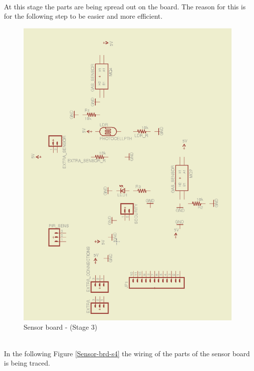 \documentclass[12pt,a4paper,draft]{report}
\begin{document}
\ \\
At this stage the parts are being spread out on the board.
The reason for this is for the following step to be easier and more efficient.
\ \\
\begin{figure}[H]
\centering
\includegraphics*[scale=0.25]{sens_brd_s3}
\caption{Sensor board -  (Stage 3)}
\label{Sensor-brd-s3}
\end{figure}
\ \\
In the following Figure \ref{Sensor-brd-s4} the wiring of the parts of the sensor board is being traced.
\ \\
\end{document}
